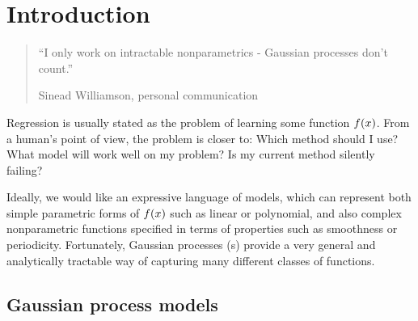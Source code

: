 
\inbpdocument

\chapter{Introduction}
\label{ch:intro}


\begin{quotation}
``I only work on intractable nonparametrics - Gaussian processes don't count.''

\hspace*{\fill} Sinead Williamson, personal communication
\end{quotation}


\nomenclature[g-pi]{$\pi$}{ $\simeq 3.14\ldots$}


Regression is usually stated as the problem of learning some function $f(x)$.
%
From a human's point of view, the problem is closer to: Which method should I use?  What model will work well on my problem?  Is my current method silently failing?


Ideally, we would like an expressive language of models, which can represent both simple parametric forms of $f(x)$ such as linear or polynomial, and also complex nonparametric functions specified in terms of properties such as smoothness or periodicity.
Fortunately, Gaussian processes (\gp{}s) provide a very general and analytically tractable way of capturing many different classes of functions.



\section{Gaussian process models}

